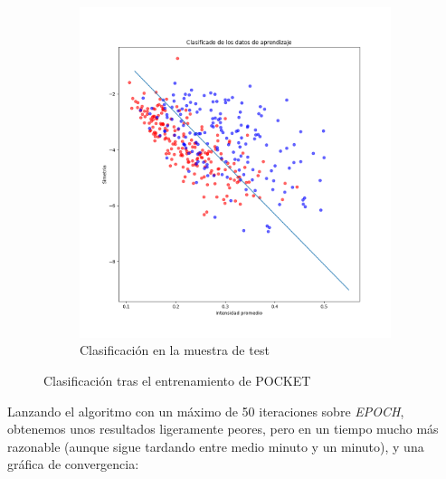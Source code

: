 \documentclass[11pt]{article}
\begin{document}
\begin{figure}[H]
\begin{subfigure}{0.3\textwidth}
        \includegraphics[scale=0.30]{clasificacion_pocket_test}
        \caption{Clasificación en la muestra de test}
    \end{subfigure}
    \caption{Clasificación tras el entrenamiento de POCKET}
\end{figure}

Lanzando el algoritmo con un máximo de 50 iteraciones sobre \emph{EPOCH}, obtenemos unos resultados ligeramente peores, pero en un tiempo mucho más razonable (aunque sigue tardando entre medio minuto y un minuto), y una gráfica de convergencia:
\end{document}

